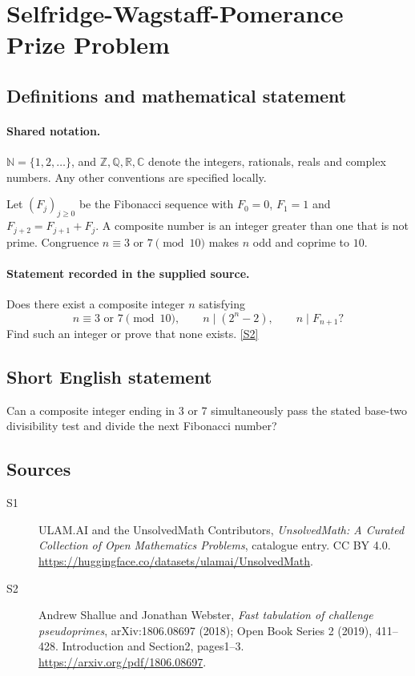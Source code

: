 \documentclass[11pt]{book}
\newcommand{\sref}[2]{\hyperlink{source:#1:#2}{[S#2]}}
\begin{document}
\section{Selfridge-Wagstaff-Pomerance Prize Problem}\label{statement}

\subsection{Definitions and mathematical statement}

\paragraph{Shared notation.}$\mathbb N=\{1,2,\ldots\}$, and $\mathbb Z,\mathbb Q,\mathbb R,\mathbb C$ denote the integers, rationals, reals and complex numbers. Any other conventions are specified locally.


Let $(F_j)_{j\geq0}$ be the Fibonacci sequence with $F_0=0$, $F_1=1$ and $F_{j+2}=F_{j+1}+F_j$. A composite number is an integer greater than one that is not prime. Congruence $n\equiv3\text{ or }7\pmod{10}$ makes $n$ odd and coprime to $10$.
\paragraph{Statement recorded in the supplied source.}
Does there exist a composite integer $n$ satisfying
\[n\equiv3\text{ or }7\pmod{10},\qquad n\mid(2^n-2),\qquad n\mid F_{n+1}?\]
Find such an integer or prove that none exists. \sref{statement}{2}
\subsection{Short English statement}
Can a composite integer ending in 3 or 7 simultaneously pass the stated base-two divisibility test and divide the next Fibonacci number?
\subsection{Sources}
\begin{description}
\item[\hypertarget{source:statement:1}{S1}] ULAM.AI and the UnsolvedMath Contributors, \emph{UnsolvedMath: A Curated Collection of Open Mathematics Problems}, catalogue entry. CC BY 4.0. \url{https://huggingface.co/datasets/ulamai/UnsolvedMath}.
\item[\hypertarget{source:statement:2}{S2}] Andrew Shallue and Jonathan Webster, \emph{Fast tabulation of challenge pseudoprimes}, arXiv:1806.08697 (2018); Open Book Series 2 (2019), 411--428. Introduction and Section2, pages1--3. \url{https://arxiv.org/pdf/1806.08697}.
\end{description}
\label{end:statement}
\end{document}
